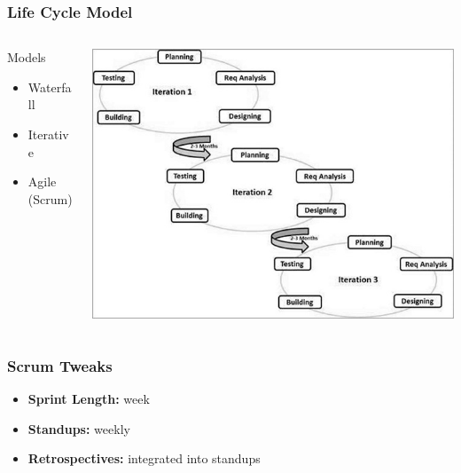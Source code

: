 \documentclass{beamer}
\begin{document}
\begin{frame}
    \frametitle{Life Cycle Model}
    \begin{columns}
        \begin{column}{0.5\textwidth}
            \begin{block}{Models}
                \begin{itemize}
                    \item Waterfall \pause
                    \item Iterative \pause
                    \item Agile (Scrum)
                \end{itemize}
            \end{block}
        \end{column}
        \begin{column}{0.5\textwidth}
            \includegraphics[scale=0.34]{../02_dev_process/res/sdlc_agile_model.jpg}
        \end{column}
    \end{columns}
\end{frame}
 
\begin{frame}
    \frametitle{Scrum Tweaks} 
    \begin{itemize}
        \item \textbf{Sprint Length:}  week \pause
        \item \textbf{Standups:} \pause weekly \pause
        \item \textbf{Retrospectives:} \pause integrated into standups
    \end{itemize}
\end{frame}
\end{document}
